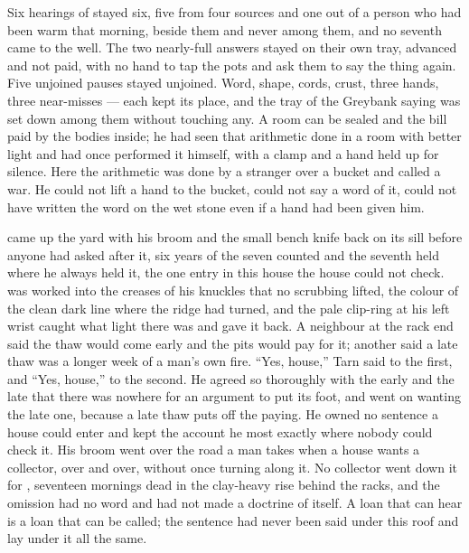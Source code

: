 \scenebreak

Six hearings of  stayed six, five from four sources and one out of a person who had been warm that morning, beside them and never among them, and no seventh came to the well. The two nearly-full answers stayed on their own tray, advanced and not paid, with no hand to tap the pots and ask them to say the thing again. Five unjoined pauses stayed unjoined. Word, shape, cords, crust, three hands, three near-misses --- each kept its place, and the tray of the Greybank saying was set down among them without touching any. A room can be sealed and the bill paid by the bodies inside; he had seen that arithmetic done in a room with better light and had once performed it himself, with a clamp and a hand held up for silence. Here the arithmetic was done by a stranger over a bucket and called a war. He could not lift a hand to the bucket, could not say a word of it, could not have written the word on the wet stone even if a hand had been given him.

 came up the yard with his broom and the small bench knife back on its sill before anyone had asked after it, six years of the seven counted and the seventh held where he always held it, the one entry in this house the house could not check.  was worked into the creases of his knuckles that no scrubbing lifted, the colour of the clean dark line where the ridge had turned, and the pale clip-ring at his left wrist caught what light there was and gave it back. A neighbour at the rack end said the thaw would come early and the pits would pay for it; another said a late thaw was a longer week of a man's own fire. “Yes, house,” Tarn said to the first, and “Yes, house,” to the second. He agreed so thoroughly with the early and the late that there was nowhere for an argument to put its foot, and went on wanting the late one, because a late thaw puts off the paying. He owned no sentence a house could enter and kept the account he most exactly where nobody could check it. His broom went over the road a man takes when a house wants a collector, over and over, without once turning along it. No collector went down it for , seventeen mornings dead in the clay-heavy rise behind the racks, and the omission had no word and had not made a doctrine of itself. A loan that can hear is a loan that can be called; the sentence had never been said under this roof and lay under it all the same.

